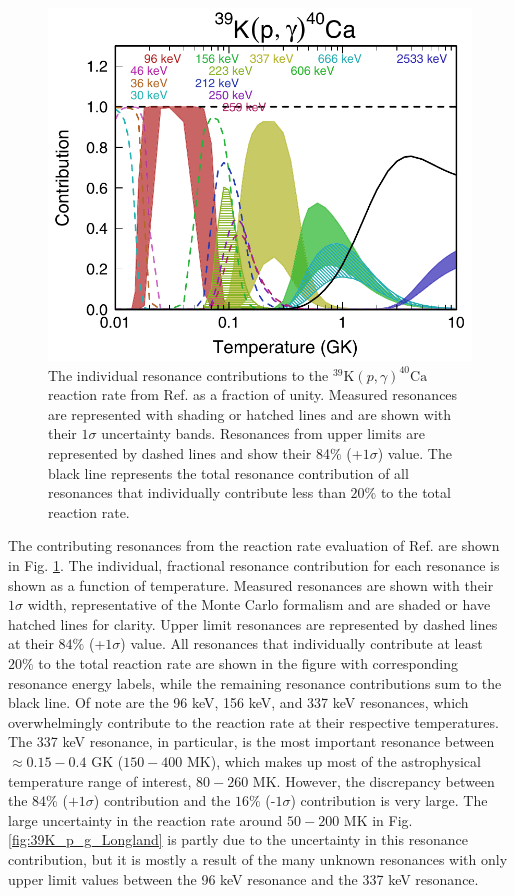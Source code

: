 \begin{figure}
\centering
\includegraphics[width=5in]{Chapter-6/figs/Contrib_Longland2018.png}
\caption{\label{fig:contrib_longland2018}The individual resonance contributions to the $^{39}\mathrm{K}(p,\gamma)^{40}\mathrm{Ca}$ reaction rate from Ref. \cite{Longland2018} as a fraction of unity. Measured resonances are represented with shading or hatched lines and are shown with their $1\sigma$ uncertainty bands. Resonances from upper limits are represented by dashed lines and show their 84$\%$ (+$1\sigma$) value. The black line represents the total resonance contribution of all resonances that individually contribute less than $20\%$ to the total reaction rate.}
\end{figure}

The contributing resonances from the reaction rate evaluation of Ref. \cite{Longland2018} are shown in Fig. \ref{fig:contrib_longland2018}. The individual, fractional resonance contribution for each resonance is shown as a function of temperature. Measured resonances are shown with their $1\sigma$ width, representative of the Monte Carlo formalism \cite{Longland2010a} and are shaded or have hatched lines for clarity. Upper limit resonances are represented by dashed lines at their $84\%$ (+$1\sigma$) value. All resonances that individually contribute at least $20\%$ to the total reaction rate are shown in the figure with corresponding resonance energy labels, while the remaining resonance contributions sum to the black line. Of note are the 96 keV, 156 keV, and 337 keV resonances, which overwhelmingly contribute to the reaction rate at their respective temperatures. The 337 keV resonance, in particular, is the most important resonance between $\approx 0.15-0.4$ GK ($150-400$ MK), which makes up most of the astrophysical temperature range of interest, $80-260$ MK. However, the discrepancy between the $84\%$ ($+1\sigma$) contribution and the $16\%$ (-$1\sigma$) contribution is very large. The large uncertainty in the reaction rate around $50-200$ MK in Fig. \ref{fig:39K_p_g_Longland} is partly due to the uncertainty in this resonance contribution, but it is mostly a result of the many unknown resonances with only upper limit values between the 96 keV resonance and the 337 keV resonance.



